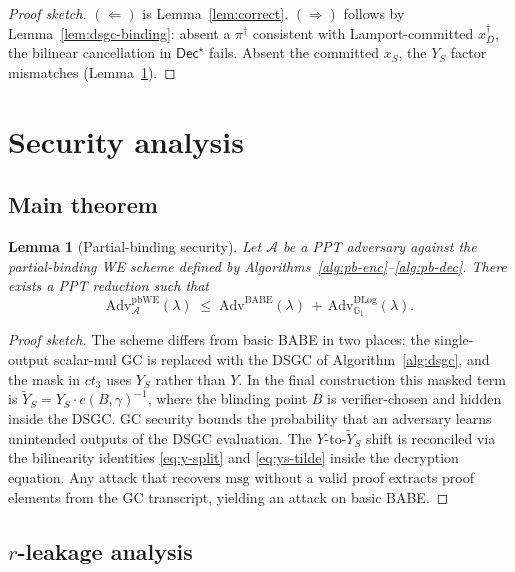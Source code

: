 \documentclass[11pt]{article}
\newtheorem{lemma}{Lemma}
\newcommand{\Gone}{\mathbb{G}_1}
\newcommand{\msg}{\mathrm{msg}}
\newcommand{\Dec}{\mathsf{Dec}}
\newcommand{\Adv}{\mathrm{Adv}}
\begin{document}
\begin{proof}[Proof sketch]
$(\Leftarrow)$ is Lemma~\ref{lem:correct}.
$(\Rightarrow)$ follows by Lemma~\ref{lem:dsgc-binding}: absent a
$\pi^\dagger$ consistent with Lamport-committed $x_D^\dagger$, the
bilinear cancellation in $\Dec^\star$ fails. Absent the committed
$x_S$, the $Y_S$ factor mismatches (Lemma~\ref{lem:pbwe}).
\end{proof}

\section{Security analysis}\label{sec:security}

\subsection{Main theorem}

\begin{lemma}[Partial-binding security]\label{lem:pbwe}
Let $\mathcal{A}$ be a PPT adversary against the partial-binding WE
scheme defined by Algorithms~\ref{alg:pb-enc}--\ref{alg:pb-dec}.
There exists a PPT reduction such that
\[
  \Adv^{\mathrm{pbWE}}_{\mathcal{A}}(\lambda)
  \;\leq\;
  \Adv^{\mathrm{BABE}}(\lambda) \,+\, \Adv^{\mathrm{DLog}}_{\Gone}(\lambda).
\]
\end{lemma}

\begin{proof}[Proof sketch]
The scheme differs from basic BABE in two places: the single-output
scalar-mul GC is replaced with the DSGC of
Algorithm~\ref{alg:dsgc}, and the mask in $ct_3$ uses $Y_S$ rather
than $Y$. In the final construction this masked term is
$\widetilde{Y}_S = Y_S \cdot e(B, \gamma)^{-1}$, where the
blinding point $B$ is verifier-chosen and hidden inside the DSGC.
GC security bounds the probability that an adversary learns
unintended outputs of the DSGC evaluation. The $Y$-to-$\widetilde{Y}_S$
shift is reconciled via the bilinearity identities
\eqref{eq:y-split} and \eqref{eq:ys-tilde} inside the decryption
equation. Any attack that recovers $\msg$ without a valid proof
extracts proof elements from the GC transcript, yielding an attack
on basic BABE.
\end{proof}

\subsection{$r$-leakage analysis}
\end{document}
